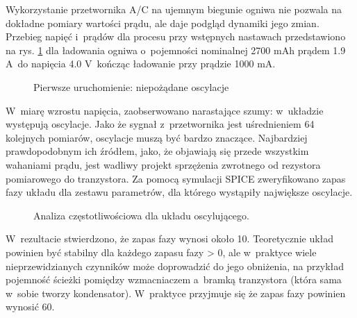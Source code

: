 \documentclass[polish,engineer]{polsl-msth}
\begin{document}
Wykorzystanie przetwornika A/C na ujemnym biegunie ogniwa nie pozwala na dokładne pomiary wartości prądu, ale daje podgląd dynamiki jego zmian. Przebieg napięć i~prądów dla procesu przy wstępnych nastawach przedstawiono na rys. \ref{img:1strun} dla ładowania ogniwa o~pojemności nominalnej 2700 mAh prądem 1.9 A~do napięcia 4.0 V~kończąc ładowanie przy prądzie 1000 mA. 

\begin{figure}[hbtp]
     \caption{Pierwsze uruchomienie: niepożądane oscylacje \label{img:1strun}}
\end{figure}
W~miarę wzrostu napięcia, zaobserwowano narastające szumy: w~układzie występują oscylacje. Jako że sygnał z~przetwornika jest uśrednieniem 64 kolejnych pomiarów, oscylacje muszą być bardzo znaczące.
Najbardziej prawdopodobnym ich źródłem, jako, że objawiają się przede wszystkim wahaniami prądu, jest wadliwy projekt sprzężenia zwrotnego od rezystora pomiarowego do tranzystora. Za pomocą symulacji SPICE zweryfikowano zapas fazy układu dla zestawu parametrów, dla którego wystąpiły największe oscylacje.
\begin{figure}[hbtp]
     \caption{Analiza częstotliwościowa dla układu oscylującego. \label{img:bode_nocap}}
\end{figure}
W~rezultacie stwierdzono, że zapas fazy wynosi około 10\degree. Teoretycznie układ powinien być stabilny dla każdego zapasu fazy > 0\degree, ale w~praktyce wiele nieprzewidzianych czynników może doprowadzić do jego obniżenia, na przykład pojemność ścieżki pomiędzy wzmacniaczem a~bramką tranzystora (która sama w~sobie tworzy kondensator). W~praktyce przyjmuje się że zapas fazy powinien wynosić 60\degree \cite{PhaseMargin_TERRELL1996383}.
\end{document}
